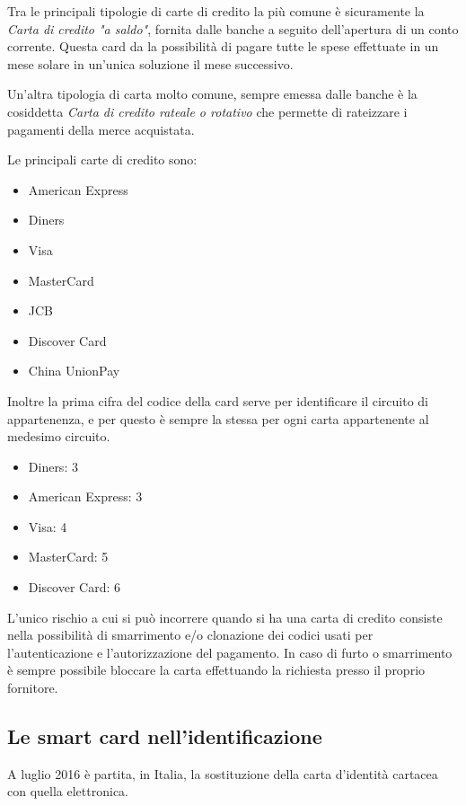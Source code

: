 Tra le principali tipologie di carte di credito la più comune è sicuramente la \textit{Carta di credito "a saldo"}, fornita dalle banche a seguito dell'apertura di un conto corrente. Questa card da la possibilità di pagare tutte le spese effettuate in un mese solare in un'unica soluzione il mese successivo.

Un'altra tipologia di carta molto comune, sempre emessa dalle banche è la cosiddetta \textit{Carta di credito rateale o rotativo} che permette di rateizzare i pagamenti della merce acquistata.

Le principali carte di credito sono:
\begin{itemize}
    \item American Express
    \item Diners
    \item Visa
    \item MasterCard
    \item JCB
    \item Discover Card
    \item China UnionPay
\end{itemize}

Inoltre la prima cifra del codice della card serve per identificare il circuito di appartenenza, e per questo è sempre la stessa per ogni carta appartenente al medesimo circuito.
\begin{itemize}
    \item Diners: 3
    \item American Express: 3
    \item Visa: 4
    \item MasterCard: 5
    \item Discover Card: 6
\end{itemize}

L'unico rischio a cui si può incorrere quando si ha una carta di credito consiste nella possibilità di smarrimento e/o clonazione dei codici usati per l'autenticazione e l'autorizzazione del pagamento. In caso di furto o smarrimento è sempre possibile bloccare la carta effettuando la richiesta presso il proprio fornitore.
\cite{Wiki_cc}

\subsection{Le smart card nell'identificazione}
\label{carta_identita_elettronica}
A luglio 2016 è partita, in Italia, la sostituzione della carta d'identità cartacea con quella elettronica.


